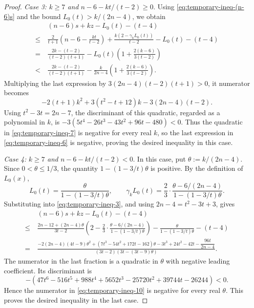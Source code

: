 \documentclass[11pt]{article}
\theoremstyle{plain}
\theoremstyle{definition}
\numberwithin{equation}{section}
\begin{document}
\begin{proof}
\smallskip
\noindent\emph{Case 3: $k\geq 7$ and $n-6-kt/(t-2)\geq 0$}.
Using \eqref{eq:temporary-ineq-(n-6)s} and the bound $L_0(t)>k/(2n-4)$, we obtain
\begin{align}\label{eq:temporary-ineq-6}
& ~ (n-6)s + kz - L_0(t) - (t - 4) \nonumber \\
\leq & ~\frac{2}{t+1} \left(n-6-\frac{kt}{t-2}\right) + \frac{k(2 - \gamma_k L_0(t))}{t - 2} - L_0(t) - (t - 4) \nonumber \\
= & ~ \frac{2k-(t-2)}{(t-2)(t+1)} - L_0(t)\left(1 + \frac{2(k-6)}{3(t-2)}\right) \nonumber \\
< & ~ \frac{2k-(t-2)}{(t-2)(t+1)} - \frac{k}{2n-4}
\left(1 + \frac{2(k-6)}{3(t-2)}\right).
\end{align}
Multiplying the last expression by $3(2n-4)(t-2)(t+1) > 0$, it numerator becomes
\begin{equation}\label{eq:temporary-ineq-7}
 -2(t+1)k^2+3(t^2-t+12)k-3(2n-4)(t-2).
\end{equation}
Using $t^2-3t=2n-7$, the discriminant of this quadratic, regarded as a polynomial in $k$, 
is $-3(5t^4 - 26t^3 - 43t^2 + 96t - 480) < 0$. Thus the quadratic in \eqref{eq:temporary-ineq-7} 
is negative for every real $k$, so the last expression in \eqref{eq:temporary-ineq-6} is negative, 
proving the desired inequality in this case.

\smallskip
\noindent\emph{Case 4: $k\geq 7$ and $n-6-kt/(t-2) < 0$}.
In this case, put $\theta := k/(2n-4)$. Since $0<\theta\leq 1/3$, the quantity
$1-(1-3/t)\theta$ is positive. By the definition of $L_0(x)$,
\[
L_0(t) = \frac{\theta}{1-(1-3/t)\theta}, \qquad
\gamma_k L_0(t) = \frac{2}{3}\cdot\frac{\theta - 6/(2n-4)}{1 - (1 - 3/t)\theta}.
\]
Substituting into \eqref{eq:temporary-ineq-3}, and using
$2n - 4 = t^2 - 3t + 3$, gives
\begin{align}\label{eq:temporary-ineq-10}
& ~ (n-6)s + kz - L_0(t) - (t - 4) \nonumber \\
\leq & ~ \frac{2n-12+(2n-4)\theta}{3t-2}
\left(2 - \frac{2}{3}\cdot\frac{\theta - 6/(2n-4)}{1 - (1 - 3/t)\theta}\right) - \frac{\theta}{1-(1-3/t)\theta} - (t - 4) \nonumber \\
= & ~\frac{-2(2n-4)(4t-9) \theta^2 + (7t^3 - 54t^2 + 172t - 162) \theta - 3t^3 + 24t^2 - 42t 
- \dfrac{96t}{2n-4}}{(3t-2) (3t - (3t - 9)\theta)}.
\end{align}
The numerator in the last fraction is a quadratic in $\theta$ with
negative leading coefficient. Its discriminant is
\[
-(47t^6 - 516t^5 + 988t^4 + 5652t^3 - 25720t^2 + 39744t - 26244) < 0.
\]
Hence the numerator in \eqref{eq:temporary-ineq-10} is negative for every real $\theta$. 
This proves the desired inequality in the last case.
\end{proof}
\end{document}

